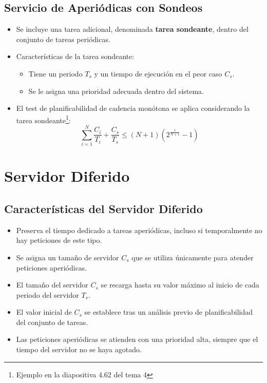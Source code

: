 \documentclass[a4paper,12pt]{article}
\begin{document}
\subsection{Servicio de Aperiódicas con Sondeos}
\begin{itemize}
    \item Se incluye una tarea adicional, denominada \textbf{tarea sondeante}, dentro del conjunto de tareas periódicas.
    \item Características de la tarea sondeante:
    \begin{itemize}
        \item Tiene un periodo \(T_s\) y un tiempo de ejecución en el peor caso \(C_s\).
        \item Se le asigna una prioridad adecuada dentro del sistema.
    \end{itemize}
    \item El test de planificabilidad de cadencia monótona se aplica considerando la tarea sondeante\footnote{Ejemplo en la diapositiva 4.62 del tema 4}:
    \[
    \sum_{i=1}^{N} \frac{C_i}{T_i} + \frac{C_s}{T_s} \leq (N + 1)\left(2^{\frac{1}{N+1}} - 1\right)
    \]
\end{itemize}

\section{Servidor Diferido}

\subsection{Características del Servidor Diferido}
\begin{itemize}
    \item Preserva el tiempo dedicado a tareas aperiódicas, incluso si temporalmente no hay peticiones de este tipo.
    \item Se asigna un tamaño de servidor \(C_s\) que se utiliza únicamente para atender peticiones aperiódicas.
    \item El tamaño del servidor \(C_s\) se recarga hasta su valor máximo al inicio de cada periodo del servidor \(T_s\).
    \item El valor inicial de \(C_s\) se establece tras un análisis previo de planificabilidad del conjunto de tareas.
    \item Las peticiones aperiódicas se atienden con una prioridad alta, siempre que el tiempo del servidor no se haya agotado.
\end{itemize}
\end{document}
